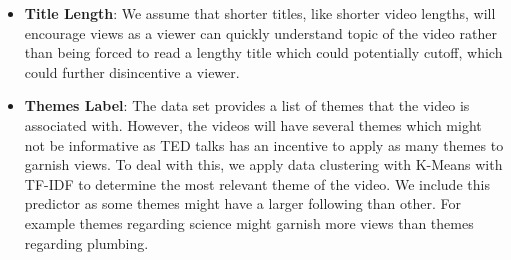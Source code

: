 \begin{itemize}
	\item \textbf{Title Length}: We assume that shorter titles, like shorter video lengths, will encourage views as a viewer can quickly understand topic of the video rather than being forced to read  a lengthy title which could potentially cutoff, which could further disincentive a viewer.
	\item \textbf{Themes Label}: The data set provides a list of themes that the video is associated with. However, the videos will have several themes which might not be informative as TED talks has an incentive to apply as many themes to garnish views. To deal with this, we apply data clustering with K-Means with TF-IDF to determine the most relevant theme of the video. We include this predictor as some themes might have a larger following than other. For example themes regarding science might garnish more views than themes regarding plumbing.
\end{itemize}
















